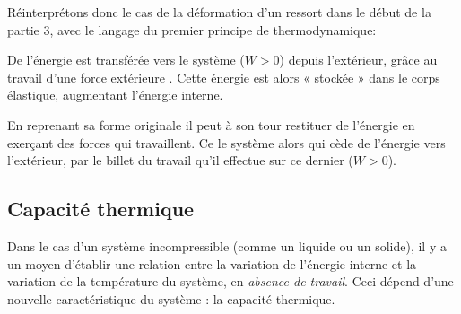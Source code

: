 \documentclass[11pt,a4paper]{article}
\begin{document}
\begin{eg}
Réinterprétons donc le cas de la déformation d'un ressort dans le début de la partie 3, avec le langage du premier principe de thermodynamique: 

De l'énergie est transférée vers le système ($W > 0 $) depuis l'extérieur, grâce au travail d'une force extérieure .  Cette énergie est alors « stockée » dans le corps élastique, augmentant l'énergie interne.  

En reprenant sa forme originale il peut à son tour restituer de l’énergie en exerçant des forces qui travaillent. Ce le système alors qui cède de l'énergie vers l'extérieur, par le billet du travail qu'il effectue sur ce dernier ($W > 0 $).
\end{eg}

\subsection{Capacité thermique}	
Dans le cas d'un système incompressible (comme un liquide ou un solide), il y a un moyen d'établir une relation entre la variation de l'énergie interne et la variation de la température du système, en \textit{absence de travail}. Ceci dépend d'une nouvelle caractéristique du système : la capacité thermique. 
\end{document}
